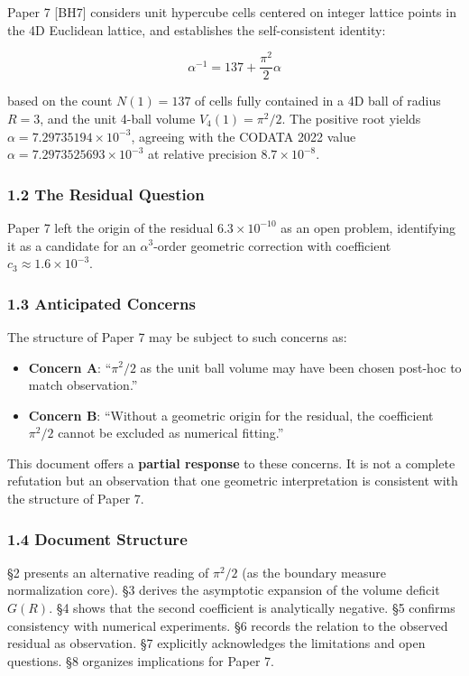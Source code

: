 \documentclass[
]{article}
\providecommand{\tightlist}{%
  \setlength{\itemsep}{0pt}\setlength{\parskip}{0pt}}
\begin{document}
Paper 7 {[}BH7{]} considers unit hypercube cells centered on integer
lattice points in the 4D Euclidean lattice, and establishes the
self-consistent identity:

\[\alpha^{-1} = 137 + \frac{\pi^2}{2}\alpha \tag{1.1}\]

based on the count \(N(1) = 137\) of cells fully contained in a 4D ball
of radius \(R = 3\), and the unit 4-ball volume \(V_4(1) = \pi^2/2\).
The positive root yields \(\alpha = 7.29735194 \times 10^{-3}\),
agreeing with the CODATA 2022 value
\(\alpha = 7.2973525693 \times 10^{-3}\) at relative precision
\(8.7 \times 10^{-8}\).

\subsubsection{1.2 The Residual Question}\label{the-residual-question}

Paper 7 left the origin of the residual \(6.3 \times 10^{-10}\) as an
open problem, identifying it as a candidate for an \(\alpha^3\)-order
geometric correction with coefficient
\(c_3 \approx 1.6 \times 10^{-3}\).

\subsubsection{1.3 Anticipated Concerns}\label{anticipated-concerns}

The structure of Paper 7 may be subject to such concerns as:

\begin{itemize}
\tightlist
\item
  \textbf{Concern A}: ``\(\pi^2/2\) as the unit ball volume may have
  been chosen post-hoc to match observation.''
\item
  \textbf{Concern B}: ``Without a geometric origin for the residual, the
  coefficient \(\pi^2/2\) cannot be excluded as numerical fitting.''
\end{itemize}

This document offers a \textbf{partial response} to these concerns. It
is not a complete refutation but an observation that one geometric
interpretation is consistent with the structure of Paper 7.

\subsubsection{1.4 Document Structure}\label{document-structure}

§2 presents an alternative reading of \(\pi^2/2\) (as the boundary
measure normalization core). §3 derives the asymptotic expansion of the
volume deficit \(G(R)\). §4 shows that the second coefficient is
analytically negative. §5 confirms consistency with numerical
experiments. §6 records the relation to the observed residual as
observation. §7 explicitly acknowledges the limitations and open
questions. §8 organizes implications for Paper 7.
\end{document}
